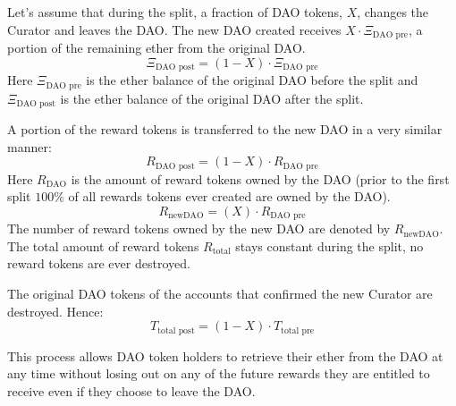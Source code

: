 \documentclass[9pt,oneside]{amsart}
\begin{document}
\begin{multicols}{2}
Let’s assume that during the split, a fraction of DAO tokens, $X$, changes the Curator and leaves the DAO. The new DAO created receives $X \cdot \Xi_{\text{DAO pre}}$, a portion of the remaining ether from the original DAO.
\begin{equation}
 \Xi_{\text{DAO post}} = (1 - X) \cdot \Xi_{\text{DAO pre}}
\end{equation}
Here $\Xi_{\text{DAO pre}}$ is the ether balance of the original DAO before the split and $\Xi_{\text{DAO post}}$ is the ether balance of the original DAO after the split.

A portion of the reward tokens is transferred to the new DAO in a very similar manner:
\begin{equation}
 R_{\text{DAO post}} = (1 - X) \cdot R_{\text{DAO pre}}
\end{equation}
Here $R_{\text{DAO}}$ is the amount of reward tokens owned by the DAO (prior to the first split $100\%$ of all rewards tokens ever created are owned by the DAO).
\begin{equation}
 R_{\text{newDAO}} = (X) \cdot R_{\text{DAO pre}}
\end{equation}
The number of reward tokens owned by the new DAO are denoted by $R_{\text{newDAO}}$.
The total amount of reward tokens $R_{\text{total}}$ stays constant during the split, no reward tokens are ever destroyed.

The original DAO tokens of the accounts that confirmed the new Curator are destroyed.
Hence:
\begin{equation}
 T_{\text{total post}}= (1 - X) \cdot T_{\text{total pre}}
\end{equation}

This process allows DAO token holders to retrieve their ether from the DAO at any time without losing out on any of the future rewards they are entitled to receive even if they choose to leave the DAO.


\end{multicols}
\end{document}
